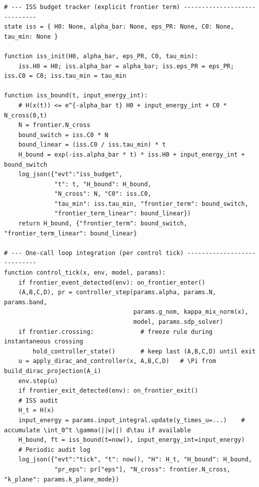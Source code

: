 \documentclass[10pt]{article}
\begin{document}
\begin{lstlisting}
# --- ISS budget tracker (explicit frontier term) -----------------------------
state iss = { H0: None, alpha_bar: None, eps_PR: None, C0: None, tau_min: None }

function iss_init(H0, alpha_bar, eps_PR, C0, tau_min):
    iss.H0 = H0; iss.alpha_bar = alpha_bar; iss.eps_PR = eps_PR; iss.C0 = C0; iss.tau_min = tau_min

function iss_bound(t, input_energy_int):
    # H(x(t)) <= e^{-alpha_bar t} H0 + input_energy_int + C0 * N_cross(0,t)
    N = frontier.N_cross
    bound_switch = iss.C0 * N
    bound_linear = (iss.C0 / iss.tau_min) * t
    H_bound = exp(-iss.alpha_bar * t) * iss.H0 + input_energy_int + bound_switch
    log_json({"evt":"iss_budget",
              "t": t, "H_bound": H_bound,
              "N_cross": N, "C0": iss.C0,
              "tau_min": iss.tau_min, "frontier_term": bound_switch,
              "frontier_term_linear": bound_linear})
    return H_bound, {"frontier_term": bound_switch, "frontier_term_linear": bound_linear}

# --- One-call loop integration (per control tick) ----------------------------
function control_tick(x, env, model, params):
    if frontier_event_detected(env): on_frontier_enter()
    (A,B,C,D), pr = controller_step(params.alpha, params.N, params.band,
                                    params.g_nom, kappa_mix_norm(x),
                                    model, params.sdp_solver)
    if frontier.crossing:             # freeze rule during instantaneous crossing
        hold_controller_state()       # keep last (A,B,C,D) until exit
    u = apply_dirac_and_controller(x, A,B,C,D)   # \Pi from build_dirac_projection(A_i)
    env.step(u)
    if frontier_exit_detected(env): on_frontier_exit()
    # ISS audit
    H_t = H(x)
    input_energy = params.input_integral.update(y_times_u=...)    # accumulate \int_0^t \gamma(||w||) d\tau if available
    H_bound, ft = iss_bound(t=now(), input_energy_int=input_energy)
    # Periodic audit log
    log_json({"evt":"tick", "t": now(), "H": H_t, "H_bound": H_bound,
              "pr_eps": pr["eps"], "N_cross": frontier.N_cross, "k_plane": params.k_plane_mode})
\end{lstlisting}
\end{document}
